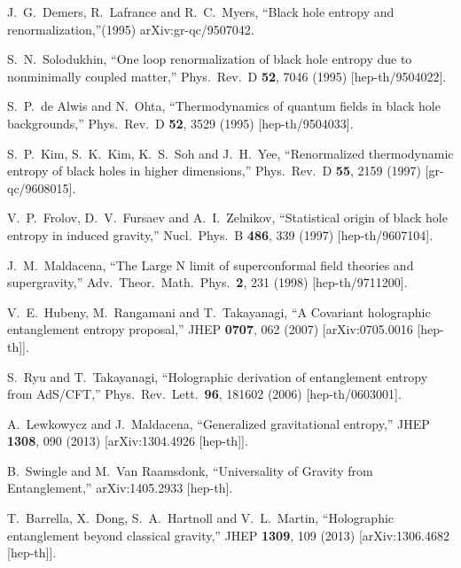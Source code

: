 \documentclass[12pt]{article}
\theoremstyle{remark}
\numberwithin{equation}{section}
\numberwithin{equation}{section}
\begin{document}
\begin{thebibliography}{99}
J.~G.~Demers, R.~Lafrance and R.~C.~Myers,
  ``Black hole entropy and renormalization,''(1995)
  arXiv:gr-qc/9507042.

S.~N.~Solodukhin,
  ``One loop renormalization of black hole entropy due to nonminimally coupled matter,''
  Phys.\ Rev.\ D {\bf 52}, 7046 (1995)
  [hep-th/9504022].

 S.~P.~de Alwis and N.~Ohta,
  ``Thermodynamics of quantum fields in black hole backgrounds,''
  Phys.\ Rev.\ D {\bf 52}, 3529 (1995)
  [hep-th/9504033].



  S.~P.~Kim, S.~K.~Kim, K.~S.~Soh and J.~H.~Yee,
  ``Renormalized thermodynamic entropy of black holes in higher dimensions,''
  Phys.\ Rev.\ D {\bf 55}, 2159 (1997)
  [gr-qc/9608015].

  V.~P.~Frolov, D.~V.~Fursaev and A.~I.~Zelnikov,
  ``Statistical origin of black hole entropy in induced gravity,''
  Nucl.\ Phys.\ B {\bf 486}, 339 (1997)
  [hep-th/9607104].


  J.~M.~Maldacena,
  ``The Large N limit of superconformal field theories and supergravity,''
  Adv.\ Theor.\ Math.\ Phys.\  {\bf 2}, 231 (1998)
  [hep-th/9711200].


  V.~E.~Hubeny, M.~Rangamani and T.~Takayanagi,
  ``A Covariant holographic entanglement entropy proposal,''
  JHEP {\bf 0707}, 062 (2007)
  [arXiv:0705.0016 [hep-th]].

  S.~Ryu and T.~Takayanagi,
  ``Holographic derivation of entanglement entropy from AdS/CFT,''
  Phys.\ Rev.\ Lett.\  {\bf 96}, 181602 (2006)
  [hep-th/0603001].


  A.~Lewkowycz and J.~Maldacena,
  ``Generalized gravitational entropy,''
  JHEP {\bf 1308}, 090 (2013)
  [arXiv:1304.4926 [hep-th]].


  B.~Swingle and M.~Van Raamsdonk,
  ``Universality of Gravity from Entanglement,''
  arXiv:1405.2933 [hep-th].

  T.~Barrella, X.~Dong, S.~A.~Hartnoll and V.~L.~Martin,
  ``Holographic entanglement beyond classical gravity,''
  JHEP {\bf 1309}, 109 (2013)
  [arXiv:1306.4682 [hep-th]].



\end{thebibliography}
\end{document}
